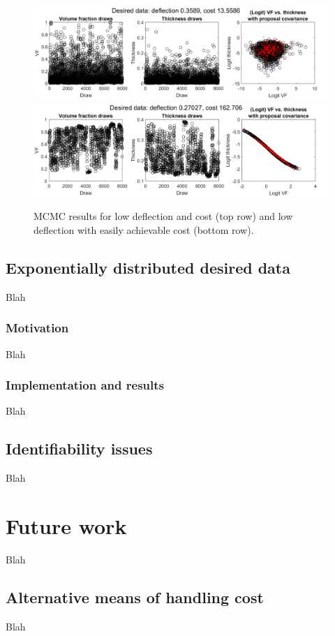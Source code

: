 \documentclass{article}
\begin{document}
\begin{figure}
\centering
\includegraphics[width=.9\linewidth]{FIG1}
\includegraphics[width=.9\linewidth]{FIG2}
\caption{MCMC results for low deflection and cost (top row) and low deflection with easily achievable cost (bottom row).}
\label{fig:des_data}
\end{figure}

\subsection{Exponentially distributed desired data}
Blah

\subsubsection{Motivation}
Blah

\subsubsection{Implementation and results}
Blah


\subsection{Identifiability issues}
Blah

\section{Future work}
Blah

\subsection{Alternative means of handling cost}
Blah
\end{document}
